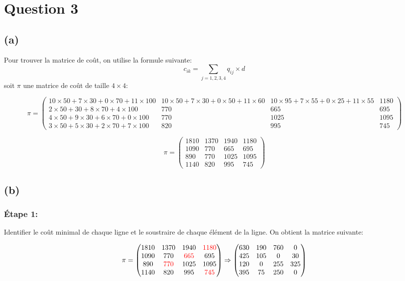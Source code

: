 \documentclass{article}
\begin{document}
\section*{Question 3}
\subsection*{(a)}
Pour trouver la matrice de coût, on utilise la formule suivante:
$$c_{ik}=\sum_{j=1,2,3,4} q_{ij} \times d_{}$$
soit $\pi$ une matrice de coût de taille $4\times 4$:

\small
\begin{center}
$$\pi=\begin{pmatrix}
10 \times 50 + 7 \times 30 + 0 \times 70 + 11 \times 100 & 10 \times 50 + 7 \times 30 + 0 \times 50 + 11 \times 60 &  10 \times 95 + 7 \times 55 + 0 \times 25 + 11 \times 55 & 1180 \\
2 \times 50 +30 + 8\times70+4\times100 & 770 & 665 & 695 \\
4 \times 50 +9 \times 30 + 6\times70+0\times100  & 770 & 1025 & 1095 \\
3 \times 50 +5\times30 + 2\times70+7\times100  & 820 & 995 & 745 
\end{pmatrix}$$

$$\pi=\begin{pmatrix}
1810 & 1370 & 1940 & 1180 \\
1090 & 770 & 665 & 695\\
890 & 770 & 1025 & 1095\\
1140 & 820 & 995 & 745

\end{pmatrix}$$

\end{center}

\normalsize
\subsection*{(b)}
\subsubsection*{Étape 1:} Identifier le coût minimal de chaque ligne et le soustraire de chaque élément de la ligne. On obtient la matrice suivante: 

$$\pi=\begin{pmatrix}
1810 & 1370 & 1940 & \textcolor{red}{1180} \\
1090 & 770 & \textcolor{red}{665} & 695\\
890 & \textcolor{red}{770} & 1025 & 1095\\
1140 & 820 & 995 & \textcolor{red}{745}
\end{pmatrix}
\Rightarrow
\begin{pmatrix}
    630 & 190 & 760 & 0 \\
    425 & 105 & 0 & 30\\
    120 & 0 & 255 & 325\\
    395 & 75 & 250 & 0
\end{pmatrix}$$
\end{document}
